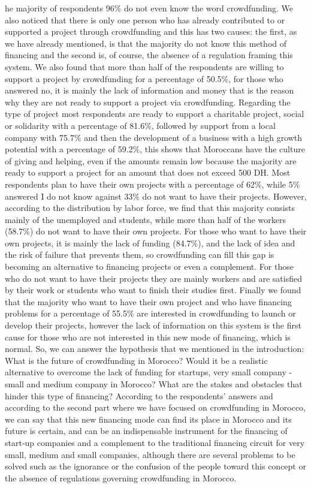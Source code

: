 he majority of respondents 96\% do not even know the word crowdfunding.
We also noticed that there is only one person who has already contributed to or supported a project through crowdfunding and this has two causes: the first, as we have already mentioned, is that the majority do not know this method of financing and the second is, of course, the absence of a regulation framing this system. We also found that more than half of the respondents are willing to support a project by crowdfunding for a percentage of 50.5\%, for those who answered no, it is mainly the lack of information and money that is the reason why they are not ready to support a project via crowdfunding. Regarding the type of project most respondents are ready to support a charitable project, social or solidarity with a percentage of 81.6\%, followed by support from a local company with 75.7\% and then the development of a business with a high growth potential with a percentage of 59.2\%, this shows that Moroccans have the culture of giving and helping, even if the amounts remain low because the majority are ready to support a project for an amount that does not exceed 500 DH. Most respondents plan to have their own projects with a percentage of 62\%, while 5\% answered I do not know against 33\% do not want to have their projects. However, according to the distribution by labor force, we find that this majority consists mainly of the unemployed and students, while more than half of the workers (58.7\%) do not want to have their own projects. For those who want to have  their own projects, it is mainly the lack of funding (84.7\%), and the lack of idea and the  risk of failure  that  prevents  them,  so  crowdfunding  can  fill  this  gap  is  becoming  an  alternative  to  financing projects  or  even  a complement.  For  those  who  do  not  want  to  have  their  projects  they  are  mainly  workers  and  are  satisfied  by  their  work  or students who want to finish their studies first. Finally we found that the majority who want to have their own project and who have financing problems for a percentage of 55.5\% are interested in crowdfunding to launch or develop their projects, however the lack of information on this system is the first cause for those who are not interested in this new mode of financing, which is normal. So, we can answer the hypothesis that we mentioned in the introduction: What  is  the  future  of  crowdfunding  in  Morocco?  Would  it  be  a  realistic  alternative  to  overcome  the  lack  of  funding  for startups, very small company - small and medium company in Morocco? What are the stakes and obstacles that hinder this type of financing? According  to  the  respondents'  answers  and  according  to  the  second  part  where  we  have  focused  on  crowdfunding  in Morocco,  we  can  say  that  this  new  financing  mode  can  find  its  place  in  Morocco  and  its  future  is  certain,  and  can  be  an indispensable instrument for the financing of start-up companies and a complement to the traditional financing circuit for very small, medium and small companies, although there are several problems to be solved such as the ignorance or the confusion of the people toward this concept or the absence of regulations governing crowdfunding in Morocco.

